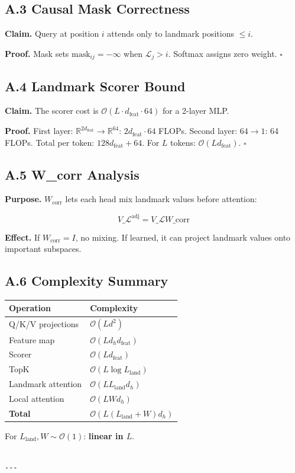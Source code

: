 \subsection{A.3 Causal Mask Correctness}

\textbf{Claim.} Query at position $i$ attends only to landmark positions $\leq i$.

\textbf{Proof.} Mask sets $\text{mask}_{ij} = -\infty$ when $\mathcal{L}_j > i$. 
Softmax assigns zero weight. $\square$

\subsection{A.4 Landmark Scorer Bound}

\textbf{Claim.} The scorer cost is $\mathcal{O}(L \cdot d_\text{feat} \cdot 64)$ 
for a 2-layer MLP.

\textbf{Proof.} First layer: $\mathbb{R}^{2 d_\text{feat}} \to \mathbb{R}^{64}$: 
$2 d_\text{feat} \cdot 64$ FLOPs. Second layer: $64 \to 1$: 64 FLOPs. Total 
per token: $128 d_\text{feat} + 64$. For $L$ tokens: $\mathcal{O}(L d_\text{feat})$. $\square$

\subsection{A.5 W\_corr Analysis}

\textbf{Purpose.} $W_\text{corr}$ lets each head mix landmark values before 
attention:

\[
V\_\mathcal{L}^\text{adj} = V\_\mathcal{L} W\_\text{corr}
\tag{A.7}
\]

\textbf{Effect.} If $W_\text{corr} = I$, no mixing. If learned, it can project 
landmark values onto important subspaces.

\subsection{A.6 Complexity Summary}

\begin{table}[H]
\centering
\small
\begin{tabular}{ll}
\toprule
\textbf{Operation} & \textbf{Complexity} \\
\midrule
Q/K/V projections & $\mathcal{O}(L d^2)$ \\
Feature map & $\mathcal{O}(L d_h d_\text{feat})$ \\
Scorer & $\mathcal{O}(L d_\text{feat})$ \\
TopK & $\mathcal{O}(L \log L_\text{land})$ \\
Landmark attention & $\mathcal{O}(L L_\text{land} d_h)$ \\
Local attention & $\mathcal{O}(L W d_h)$ \\
\textbf{Total} & $\mathcal{O}(L(L_\text{land} + W) d_h)$ \\
\bottomrule
\end{tabular}
\end{table}

For $L_\text{land}, W \sim \mathcal{O}(1)$: \textbf{linear in $L$}.
\begin{lstlisting}

---
\end{lstlisting}